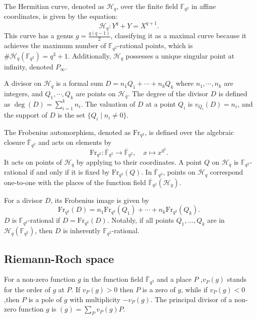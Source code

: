 \documentclass[a4paper]{amsart}
\theoremstyle{plain}
\theoremstyle{definition}
\theoremstyle{remark}
\begin{document}
The Hermitian curve, denoted as $\mathscr{H}_q$, over the finite field $\mathbb{F}_{q^2}$ in affine coordinates, is given by the equation:
\[
	\mathscr{H}_q: Y^q + Y = X^{q+1}.
\]
This curve has a genus $g = \frac{q(q-1)}{2}$, classifying it as a maximal curve because it achieves the maximum number of $\mathbb{F}_{q^2}$-rational points, which is $\#\mathscr{H}_q(\mathbb{F}_{q^2}) = q^3 + 1$. Additionally, $\mathscr{H}_q$ possesses a unique singular point at infinity, denoted $P_{\infty}$.

A divisor on $\mathscr{H}_q$ is a formal sum $D = n_1 Q_1 + \cdots + n_k Q_k$ where $n_1, \cdots, n_k$ are integers, and $Q_1, \cdots, Q_k$ are points on $\mathscr{H}_q$. The degree of the divisor $D$ is defined as $\deg(D) = \sum_{i=1}^k n_i$. The valuation of $D$ at a point $Q_i$ is $v_{Q_i}(D) = n_i$, and the support of $D$ is the set $\{ Q_i \mid n_i \neq 0 \}$.

The Frobenius automorphism, denoted as $\text{Fr}_{q^2}$, is defined over the algebraic closure $\overline{\mathbb{F}}_{q^2}$ and acts on elements by
\[
	\text{Fr}_{q^2}: \overline{\mathbb{F}}_{q^2} \to \overline{\mathbb{F}}_{q^2}, \quad x \mapsto x^{q^2}.
\]
It acts on points of $\mathscr{H}_q$ by applying to their coordinates. A point $Q$ on $\mathscr{H}_q$ is $\mathbb{F}_{q^2}$-rational if and only if it is fixed by $\text{Fr}_{q^2}(Q)$. In $\overline{\mathbb{F}}_{q^2}$, points on $\mathscr{H}_q$ correspond one-to-one with the places of the function field $\overline{\mathbb{F}}_{q^2}(\mathscr{H}_q)$.

For a divisor $D$, its Frobenius image is given by
\[
	\text{Fr}_{q^2}(D) = n_1 \text{Fr}_{q^2}(Q_1) + \cdots + n_k \text{Fr}_{q^2}(Q_k).
\]
$D$ is $\mathbb{F}_{q^2}$-rational if $D = \text{Fr}_{q^2}(D)$. Notably, if all points $Q_1, \ldots, Q_k$ are in $\mathscr{H}_q(\mathbb{F}_{q^2})$, then $D$ is inherently $\mathbb{F}_{q^2}$-rational.

\subsection*{Riemann-Roch space}

For a non-zero function $g$ in the function field $\bar{\mathbb{F}}_{q^2}$ and a place $P$ ,$v_P(g)$ stands for the order of $g$ at $P$. If $v_P(g) > 0$ then $P$ is a zero of $g$, while if $v_P(g) < 0 $,then $P$ is a pole of $g$ with multiplicity  $-v_P(g)$. The principal divisor of a non-zero function $g$ is $(g)= \sum_{P}v_P(g) P$.
\end{document}
